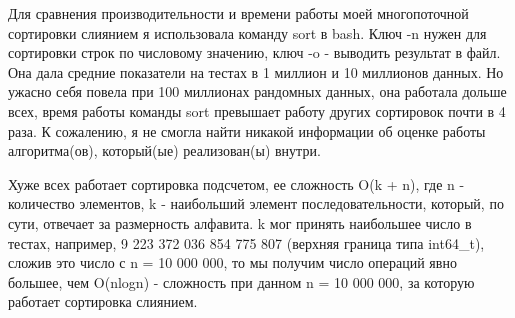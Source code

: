 Для сравнения производительности и времени работы моей многопоточной сортировки слиянием я использовала команду sort в bash. Ключ -n нужен для сортировки строк по числовому значению, ключ -o - выводить результат в файл. Она дала средние показатели на тестах в 1 миллион и 10 миллионов данных. Но ужасно себя повела при 100 миллионах рандомных данных, она работала дольше всех, время работы команды sort превышает работу других сортировок почти в 4 раза. К сожалению, я не смогла найти никакой информации об оценке работы алгоритма(ов), который(ые) реализован(ы) внутри.

Хуже всех работает сортировка подсчетом, ее сложность O(k + n), где n - количество элементов, k - наибольший элемент последовательности, который, по сути, отвечает за размерность алфавита. k мог принять наибольшее число в тестах, например, 9 223 372 036 854 775 807 (верхняя граница типа int64\_t), сложив это число с n = 10 000 000, то мы получим число операций явно большее, чем O(nlogn) - сложность при данном n = 10 000 000, за которую работает сортировка слиянием.

